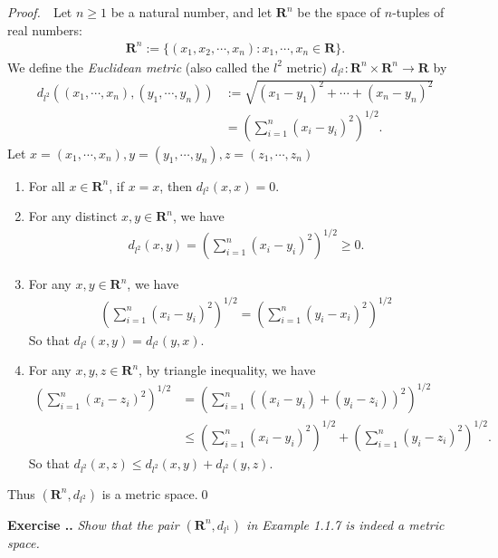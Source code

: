\documentclass{book}
\newcommand{\pff}{\vspace{.25em}\noindent\emph{Proof.}~~}
\newcounter{Exercise}[section]
\renewcommand{\theExercise}{\thesection.\arabic{Exercise}.}
\newcommand{\new}{\vspace{1.5em}\noindent\textbf{Exercise \stepcounter{Exercise}\textbf{\theExercise}} }
\begin{document}
\pff Let $n\geq 1$ be a natural number, and let $\mathbf{R}^n$ be the space of $n$-tuples of real numbers:
    \begin{align*}
        \mathbf{R}^n:=\{(x_1,x_2,\cdots,x_n):x_1,\cdots,x_n\in\mathbf{R}\}.
    \end{align*}
We define the \emph{Euclidean metric} (also called the $l^2$ metric) $d_{l^2}:\mathbf{R}^n\times\mathbf{R}^n\to\mathbf{R}$ by
    \begin{align*}
        d_{l^2}((x_1,\cdots,x_n),(y_1,\cdots,y_n))
        &:=\sqrt{(x_1-y_1)^2+\cdots+(x_n-y_n)^2}\\
        &=\left(\sum_{i=1}^{n}(x_i-y_i)^2\right)^{1/2}.
    \end{align*}
Let $x=(x_1,\cdots,x_n),y=(y_1,\cdots,y_n),z=(z_1,\cdots,z_n)$
    \begin{enumerate}
        \item For all $x\in\mathbf{R}^n$, if $x=x$, then $d_{l^2}(x,x)=0$.
        \item For any distinct $x,y\in\mathbf{R}^n$, we have
            \begin{align*}
                d_{l^2}(x,y)=\left(\sum_{i=1}^{n}(x_i-y_i)^2\right)^{1/2}\geq 0.
            \end{align*}
        \item For any $x,y\in\mathbf{R}^n$, we have
            \begin{align*}
                \left(\sum_{i=1}^{n}(x_i-y_i)^2\right)^{1/2}
                =\left(\sum_{i=1}^{n}(y_i-x_i)^2\right)^{1/2}
            \end{align*}
        So that $d_{l^2}(x,y)=d_{l^2}(y,x)$.
        \item For any $x,y,z\in\mathbf{R}^n$, by triangle inequality, we have
            \begin{align*}
                \left(\sum_{i=1}^{n}(x_i-z_i)^2\right)^{1/2}
                &=\left(\sum_{i=1}^{n}((x_i-y_i)+(y_i-z_i))^2\right)^{1/2}\\
                &\leq\left(\sum_{i=1}^{n}(x_i-y_i)^2\right)^{1/2}+\left(\sum_{i=1}^{n}(y_i-z_i)^2\right)^{1/2}.
            \end{align*}
        So that $d_{l^2}(x,z)\leq d_{l^2}(x,y)+d_{l^2}(y,z)$.
    \end{enumerate}
Thus $(\mathbf{R}^n,d_{l^2})$ is a metric space.\qed

\new\emph{Show that the pair $(\mathbf{R}^n,d_{l^1})$ in Example 1.1.7 is indeed a metric space.}
\end{document}
